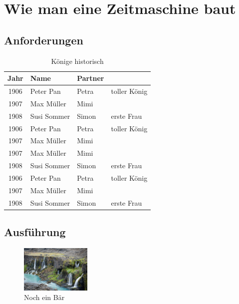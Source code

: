 \chapter{Wie man eine Zeitmaschine baut}

\lipsum[1-1] 

\section{Anforderungen}

\lipsum[1-1]

\begin{table}
  \centering
  \begin{tabularx}{0.9\textwidth}{ c l l X }
    Jahr & Name & Partner & \\
    \hline\noalign{\smallskip}
    1906 & Peter Pan & Petra & toller König \\ 
    1907 & Max Müller & Mimi &  \\  
    1908 & Susi Sommer & Simon & erste Frau \\
    1906 & Peter Pan & Petra & toller König \\ 
    1907 & Max Müller & Mimi &  \\  
    1907 & Max Müller & Mimi &  \\  
    1908 & Susi Sommer & Simon & erste Frau \\
    1906 & Peter Pan & Petra & toller König \\ 
    1907 & Max Müller & Mimi &  \\  
    1908 & Susi Sommer & Simon & erste Frau \\
  \end{tabularx}
  \caption{Könige historisch}
  \label{fig:tab_koenige_historisch}
\end{table}

\section{Ausführung}

\lipsum[1-1]

\begin{figure}
  \centering
  \includegraphics[width=0.3\textwidth]{fotos/b}
  \caption{Noch ein Bär}
\end{figure}

\lipsum[1-4]